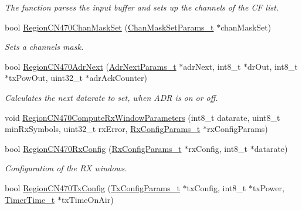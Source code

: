 \begin{DoxyCompactItemize}
\begin{DoxyCompactList}\small\item\em The function parses the input buffer and sets up the channels of the CF list. \end{DoxyCompactList}\item 
bool \mbox{\hyperlink{group___r_e_g_i_o_n_c_n470_ga361aa9a80854b1a264a9ad0720cbd4da}{Region\+C\+N470\+Chan\+Mask\+Set}} (\mbox{\hyperlink{group___r_e_g_i_o_n_ga6d24f7da136006410827dfb29f6b9b9e}{Chan\+Mask\+Set\+Params\+\_\+t}} $\ast$chan\+Mask\+Set)
\begin{DoxyCompactList}\small\item\em Sets a channels mask. \end{DoxyCompactList}\item 
bool \mbox{\hyperlink{group___r_e_g_i_o_n_c_n470_ga5205fdda3f4a869d78f4ccd791de359e}{Region\+C\+N470\+Adr\+Next}} (\mbox{\hyperlink{group___r_e_g_i_o_n_ga567c2742622326b350b4e91bbf61b4ce}{Adr\+Next\+Params\+\_\+t}} $\ast$adr\+Next, int8\+\_\+t $\ast$dr\+Out, int8\+\_\+t $\ast$tx\+Pow\+Out, uint32\+\_\+t $\ast$adr\+Ack\+Counter)
\begin{DoxyCompactList}\small\item\em Calculates the next datarate to set, when A\+DR is on or off. \end{DoxyCompactList}\item 
void \mbox{\hyperlink{group___r_e_g_i_o_n_c_n470_gabb50864b958d868d7c2fbb09a7238a23}{Region\+C\+N470\+Compute\+Rx\+Window\+Parameters}} (int8\+\_\+t datarate, uint8\+\_\+t min\+Rx\+Symbols, uint32\+\_\+t rx\+Error, \mbox{\hyperlink{group___r_e_g_i_o_n_ga375c038078dfcfc7ef14280021db719e}{Rx\+Config\+Params\+\_\+t}} $\ast$rx\+Config\+Params)
\item 
bool \mbox{\hyperlink{group___r_e_g_i_o_n_c_n470_gadb4b05f4e7b55705e37156add3ed585b}{Region\+C\+N470\+Rx\+Config}} (\mbox{\hyperlink{group___r_e_g_i_o_n_ga375c038078dfcfc7ef14280021db719e}{Rx\+Config\+Params\+\_\+t}} $\ast$rx\+Config, int8\+\_\+t $\ast$datarate)
\begin{DoxyCompactList}\small\item\em Configuration of the RX windows. \end{DoxyCompactList}\item 
bool \mbox{\hyperlink{group___r_e_g_i_o_n_c_n470_ga2de0fae78c1759fec62a835b0fcb3829}{Region\+C\+N470\+Tx\+Config}} (\mbox{\hyperlink{group___r_e_g_i_o_n_gabed730d4d04b0b60d4b6d1966d3f21d3}{Tx\+Config\+Params\+\_\+t}} $\ast$tx\+Config, int8\+\_\+t $\ast$tx\+Power, \mbox{\hyperlink{utilities_8h_a4215ca43d3e953099ea758ce428599d0}{Timer\+Time\+\_\+t}} $\ast$tx\+Time\+On\+Air)

\end{DoxyCompactItemize}

